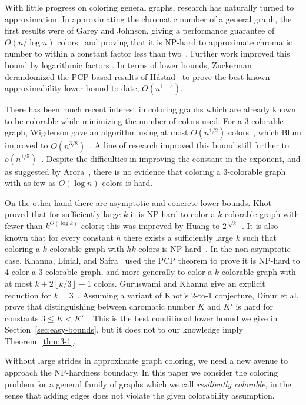 \documentclass{llncs}
\begin{document}
With little progress on coloring general graphs, research has naturally turned
to approximation. In approximating the chromatic number of a general graph, the
first results were of Garey and Johnson, giving a performance guarantee of
$O(n/\log n)$ colors~\cite{Johnson74} and proving that it is NP-hard to
approximate chromatic number to within a constant factor less than
two~\cite{GJ76}. Further work improved this bound by logarithmic factors
\cite{BR90,Ha93}. In terms of lower bounds, Zuckerman~\cite{Zu07} derandomized
the PCP-based results of H{\aa}stad~\cite{Ha99} to prove the best known
approximability lower-bound to date, $O(n^{1-\varepsilon})$.

There has been much recent interest in coloring graphs which are already known
to be colorable while minimizing the number of colors used. For a 3-colorable
graph, Wigderson gave an algorithm using at most $O(n^{1/2})$
colors~\cite{Wi83}, which Blum improved to $\tilde{O}(n^{3/8})$~\cite{Blum94}.
A line of research improved this bound still further to
$o(n^{1/5})$~\cite{KawarabayashiT14}. Despite the difficulties in improving the
constant in the exponent, and as suggested by Arora~\cite{Arora11}, there is no
evidence that coloring a 3-colorable graph with as few as $O(\log n)$ colors is
hard.

On the other hand there are asymptotic and concrete lower bounds.
Khot~\cite{Khot01} proved that for sufficiently large $k$ it is NP-hard to
color a $k$-colorable graph with fewer than $k^{O(\log{k})}$ colors; this was
improved by Huang to $2^{\sqrt[3]{k}}$~\cite{Huang13}. It is also known that
for every constant $h$ there exists a sufficiently large $k$ such that coloring
a $k$-colorable graph with $hk$ colors is NP-hard~\cite{DMR06}.  In the
non-asymptotic case, Khanna, Linial, and Safra~\cite{KLS00} used the PCP
theorem to prove it is NP-hard to 4-color a 3-colorable graph, and more
generally to color a $k$ colorable graph with at most $k + 2\left \lfloor k/3
\right \rfloor - 1$ colors. Guruswami and Khanna  give an explicit reduction
for $k=3$~\cite{GuKh2000}. Assuming a variant of Khot's 2-to-1 conjecture,
Dinur et al. prove that distinguishing between chromatic number $K$ and $K'$ is
hard for constants $3 \leq K < K'$~\cite{DMR06}. This is the best conditional
lower bound we give in Section~\ref{sec:easy-bounds}, but it does not to our
knowledge imply Theorem~\ref{thm:3-1}.

Without large strides in approximate graph coloring, we need a new avenue to
approach the NP-hardness boundary. In this paper we consider the coloring
problem for a general family of graphs which we call \emph{resiliently
colorable}, in the sense that adding edges does not violate the given
colorability assumption. 
\end{document}
